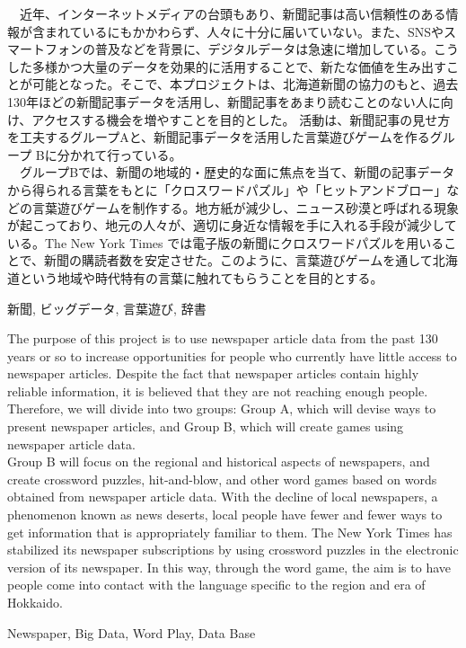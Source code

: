 \documentclass[openany, 11pt,papersize,dvipdfm]{jsbook}
\begin{document}
%
\maketitle

\frontmatter

\begin{jabstract}
　近年、インターネットメディアの台頭もあり、新聞記事は高い信頼性のある情報が含まれているにもかかわらず、人々に十分に届いていない。また、SNSやスマートフォンの普及などを背景に、デジタルデータは急速に増加している。こうした多様かつ大量のデータを効果的に活用することで、新たな価値を生み出すことが可能となった。そこで、本プロジェクトは、北海道新聞の協力のもと、過去130年ほどの新聞記事データを活用し、新聞記事をあまり読むことのない人に向け、アクセスする機会を増やすことを目的とした。
活動は、新聞記事の見せ方を工夫するグループAと、新聞記事データを活用した言葉遊びゲームを作るグループ Bに分かれて行っている。\\
　グループBでは、新聞の地域的・歴史的な面に焦点を当て、新聞の記事データから得られる言葉をもとに「クロスワードパズル」や「ヒットアンドブロー」などの言葉遊びゲームを制作する。地方紙が減少し、ニュース砂漠と呼ばれる現象が起こっており、地元の人々が、適切に身近な情報を手に入れる手段が減少している。The New York Times では電子版の新聞にクロスワードパズルを用いることで、新聞の購読者数を安定させた。このように、言葉遊びゲームを通して北海道という地域や時代特有の言葉に触れてもらうことを目的とする。
\begin{jkeyword}
新聞, ビッグデータ, 言葉遊び, 辞書
\end{jkeyword}
\end{jabstract}

\begin{eabstract} The purpose of this project is to use newspaper article data from the past 130 years or so to increase opportunities for people who
currently have little access to newspaper articles. Despite the fact that newspaper articles contain highly reliable information, it is
believed that they are not reaching enough people. Therefore, we will divide into two groups: Group A, which will devise ways to
present newspaper articles, and Group B, which will create games using newspaper article data.\\
Group B will focus on the regional and historical aspects of newspapers, and create crossword puzzles, hit-and-blow, and other word games based on words obtained from newspaper article data. With the decline of local newspapers, a phenomenon known as news deserts, local people have fewer and fewer ways to get information that is appropriately familiar to them. The New York Times has stabilized its newspaper subscriptions by using crossword puzzles in the electronic version of its newspaper.
In this way, through the word game, the aim is to have people come into contact with the language specific to the region and era of Hokkaido.
\begin{ekeyword}
Newspaper, Big Data, Word Play, Data Base
\end{ekeyword}
\end{eabstract}
\end{document}
